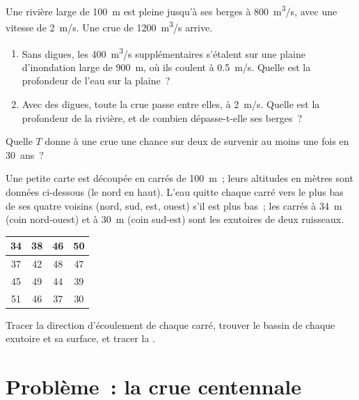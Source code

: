 \begin{exercise}[$\star\star\star$]\label{exo:g10:drainage-basins:13}
Une rivière large de \qty{100}{m} est pleine jusqu'à ses berges à
\qty{800}{m^3/s}, avec une vitesse de \qty{2}{m/s}. Une crue de
\qty{1200}{m^3/s} arrive.
\begin{enumerate}
  \item Sans digues, les \qty{400}{m^3/s} supplémentaires s'étalent sur une
        plaine d'inondation large de \qty{900}{m}, où ils coulent à
        \qty{0.5}{m/s}. Quelle est la profondeur de l'eau sur la plaine~?
  \item Avec des digues, toute la crue passe entre elles, à \qty{2}{m/s}.
        Quelle est la profondeur de la rivière, et de combien dépasse-t-elle
        ses berges~?
\end{enumerate}
\end{exercise}

\begin{exercise}[$\star\star\star$]\label{exo:g10:drainage-basins:14}
Quelle  $T$ donne à une crue une chance sur deux de
survenir au moins une fois en \num{30}~ans~?
\end{exercise}

\begin{exercise}[$\star\star\star$]\label{exo:g10:drainage-basins:15}
Une petite carte est découpée en carrés de \qty{100}{m}~; leurs altitudes en
mètres sont données ci-dessous (le nord en haut). L'eau quitte chaque carré
vers le plus bas de ses quatre voisins (nord, sud, est, ouest) s'il est plus
bas~; les carrés à \qty{34}{m} (coin nord-ouest) et à \qty{30}{m} (coin
sud-est) sont les exutoires de deux ruisseaux.
\begin{center}
\begin{tabular}{|c|c|c|c|}
\hline
34 & 38 & 46 & 50 \\ \hline
37 & 42 & 48 & 47 \\ \hline
45 & 49 & 44 & 39 \\ \hline
51 & 46 & 37 & 30 \\ \hline
\end{tabular}
\end{center}
Tracer la direction d'écoulement de chaque carré, trouver le bassin de
chaque exutoire et sa surface, et tracer la .
\end{exercise}

\section{Problème~: la crue centennale}

